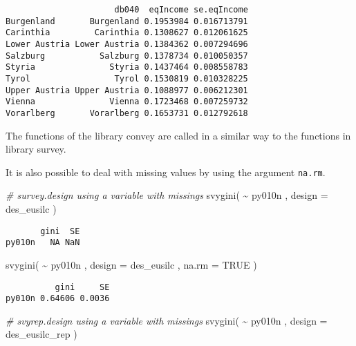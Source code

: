 \documentclass[
]{book}
\newenvironment{Shaded}{\begin{snugshade}}{\end{snugshade}}
\newcommand{\AttributeTok}[1]{\textcolor[rgb]{0.77,0.63,0.00}{#1}}
\newcommand{\CommentTok}[1]{\textcolor[rgb]{0.56,0.35,0.01}{\textit{#1}}}
\newcommand{\ConstantTok}[1]{\textcolor[rgb]{0.00,0.00,0.00}{#1}}
\newcommand{\FunctionTok}[1]{\textcolor[rgb]{0.00,0.00,0.00}{#1}}
\newcommand{\NormalTok}[1]{#1}
\newcommand{\SpecialCharTok}[1]{\textcolor[rgb]{0.00,0.00,0.00}{#1}}
\begin{document}
\begin{verbatim}
                      db040  eqIncome se.eqIncome
Burgenland       Burgenland 0.1953984 0.016713791
Carinthia         Carinthia 0.1308627 0.012061625
Lower Austria Lower Austria 0.1384362 0.007294696
Salzburg           Salzburg 0.1378734 0.010050357
Styria               Styria 0.1437464 0.008558783
Tyrol                 Tyrol 0.1530819 0.010328225
Upper Austria Upper Austria 0.1088977 0.006212301
Vienna               Vienna 0.1723468 0.007259732
Vorarlberg       Vorarlberg 0.1653731 0.012792618
\end{verbatim}

The functions of the library convey are called in a similar way to the functions in library survey.

It is also possible to deal with missing values by using the argument \texttt{na.rm}.

\begin{Shaded}
\begin{Highlighting}[]
\CommentTok{\# survey.design using a variable with missings}
\FunctionTok{svygini}\NormalTok{( }\SpecialCharTok{\textasciitilde{}}\NormalTok{ py010n , }\AttributeTok{design =}\NormalTok{ des\_eusilc )}
\end{Highlighting}
\end{Shaded}

\begin{verbatim}
       gini  SE
py010n   NA NaN
\end{verbatim}

\begin{Shaded}
\begin{Highlighting}[]
\FunctionTok{svygini}\NormalTok{( }\SpecialCharTok{\textasciitilde{}}\NormalTok{ py010n , }\AttributeTok{design =}\NormalTok{ des\_eusilc , }\AttributeTok{na.rm =} \ConstantTok{TRUE}\NormalTok{ )}
\end{Highlighting}
\end{Shaded}

\begin{verbatim}
          gini     SE
py010n 0.64606 0.0036
\end{verbatim}

\begin{Shaded}
\begin{Highlighting}[]
\CommentTok{\# svyrep.design using a variable with missings}
\FunctionTok{svygini}\NormalTok{( }\SpecialCharTok{\textasciitilde{}}\NormalTok{ py010n , }\AttributeTok{design =}\NormalTok{ des\_eusilc\_rep )}
\end{Highlighting}
\end{Shaded}
\end{document}
